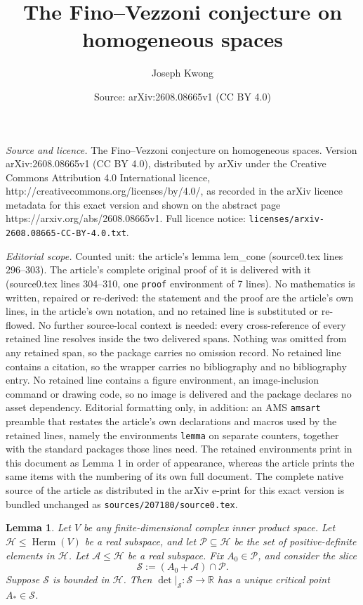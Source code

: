 \documentclass[10pt,a4paper]{amsart}
\title{The Fino--Vezzoni conjecture on homogeneous spaces}
\author{Joseph Kwong}
\date{Source: arXiv:2608.08665v1 (CC BY 4.0)}
\newtheorem{lemma}{Lemma}
\newcommand{\A}{\mathcal A}
\renewcommand{\H}{\mathcal H}
\newcommand{\Herm}{{\operatorname{Herm}}}
\renewcommand{\P}{\mathcal {P}}
\newcommand{\R}{\mathbb R}
\renewcommand{\S}{\mathcal S}
\begin{document}
\maketitle

\noindent\emph{Source and licence.} The Fino--Vezzoni conjecture on homogeneous spaces. Version arXiv:2608.08665v1 (CC BY 4.0), distributed by arXiv under the Creative Commons Attribution 4.0 International licence, http://creativecommons.org/licenses/by/4.0/, as recorded in the arXiv licence metadata for this exact version and shown on the abstract page https://arxiv.org/abs/2608.08665v1. Full licence notice: \texttt{licenses/arxiv-2608.08665-CC-BY-4.0.txt}.\par\smallskip

\noindent\textit{Editorial scope.} Counted unit: the article's lemma lem\_cone (source0.tex lines 296--303). The article's complete original proof of it is delivered with it (source0.tex lines 304--310, one \texttt{proof} environment of 7 lines). No mathematics is written, repaired or re-derived: the statement and the proof are the article's own lines, in the article's own notation, and no retained line is substituted or re-flowed.  No further source-local context is needed: every cross-reference of every retained line resolves inside the two delivered spans.  Nothing was omitted from any retained span, so the package carries no omission record.  No retained line contains a citation, so the wrapper carries no bibliography and no bibliography entry.  No retained line contains a figure environment, an image-inclusion command or drawing code, so no image is delivered and the package declares no asset dependency.  Editorial formatting only, in addition: an AMS \texttt{amsart} preamble that restates the article's own declarations and macros used by the retained lines, namely the environments \texttt{lemma} on separate counters, together with the standard packages those lines need.  The retained environments print in this document as Lemma 1 in order of appearance, whereas the article prints the same items with the numbering of its own full document.  The complete native source of the article as distributed in the arXiv e-print for this exact version is bundled unchanged as \texttt{sources/207180/source0.tex}.
\begin{lemma}
    \label{lem_cone}
    Let $V$ be any finite-dimensional complex inner product space. Let $\H \leq \Herm(V)$ be a real subspace, and let
    $\P \subseteq \H$ be the set of positive-definite elements in $\H$.
    Let $\A \leq \H$ be a real subspace. Fix $A_0 \in \P$, and consider the slice
    $$\S := (A_0 + \A) \cap \P.$$
    Suppose $\S$ is bounded in $\H$. Then $\det|_\S:\S \rightarrow \R$ has a unique critical point $A_* \in \S$.
\end{lemma}
\end{document}
